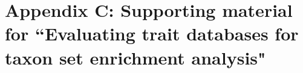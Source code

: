\chapter{Appendix C: Supporting material for ``Evaluating trait databases for taxon set enrichment analysis"}